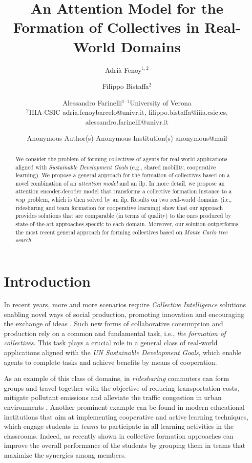 \documentclass{article}
\title{An Attention Model for the Formation of Collectives in Real-World Domains}
\author{
Adrià Fenoy$^{1,2}$
\and
Filippo Bistaffa$^2$\and
Alessandro Farinelli$^{1}$
\affiliations
$^1$University of Verona\\
$^2$IIIA-CSIC
\emails
adria.fenoybarcelo@univr.it,
filippo.bistaffa@iiia.csic.es,
alessandro.farinelli@univr.it
}
\author{
Anonymous Author(s)
\affiliations
Anonymous Institution(s)
\emails
anonymous@mail
}
\theoremstyle{definition}
\begin{document}
\maketitle

\begin{abstract}
We consider the problem of forming collectives of agents for real-world applications aligned with \emph{Sustainable Development Goals} (e.g., shared mobility, cooperative learning).
We propose a general approach for the formation of collectives based on a novel combination of an \emph{attention model} and an \gls{ilp}.
In more detail, we propose an attention encoder-decoder model that transforms a collective formation instance to a \acrlong{wsp} problem, which is then solved by an \gls{ilp}.
Results on two real-world domains (i.e., ridesharing and team formation for cooperative learning) show that our approach provides solutions that are comparable (in terms of quality) to the ones produced by state-of-the-art approaches specific to each domain. Moreover, our solution outperforms the most recent general approach for forming collectives based on \emph{Monte Carlo tree search}.
\end{abstract}

\section{Introduction}

In recent years, more and more scenarios require \emph{Collective Intelligence} solutions enabling novel ways of social production, promoting innovation and encouraging the exchange of ideas \cite{eu}. Such new forms of collaborative consumption and production rely on a common and fundamental task, i.e., \emph{the formation of collectives}.
This task plays a crucial role in a general class of real-world applications aligned with the \emph{UN Sustainable Development Goals}, which enable agents to complete tasks and achieve benefits by means of cooperation. %

As an example of this class of domains, in \emph{ridesharing} commuters can form groups and travel together with the objective of reducing transportation costs, mitigate pollutant emissions and alleviate the traffic congestion in urban environments \cite{bistaffa2019computational,alonso2017demand}.
Another prominent example can be found in modern educational institutions that aim at implementing cooperative and active learning techniques, which engage students in \emph{teams} to participate in all learning activities in the classrooms.
Indeed, as recently shown in \cite{andrejczuk2019synergistic} collective formation approaches can improve the overall performance of the students by grouping them in teams that maximize the synergies among members.
\end{document}
